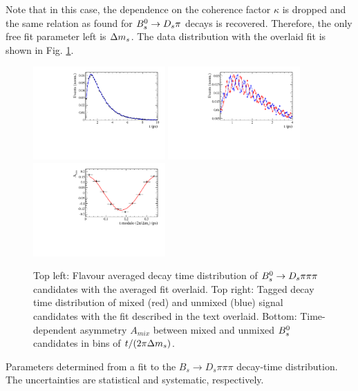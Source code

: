 Note that in this case, the dependence on the coherence factor $\kappa$ is dropped and the same relation as found for ${{B}^0_{s}}\rightarrow{\ensuremath{{D}_{s}}}{\ensuremath{\pi}}$ decays is recovered. 
Therefore, the only free fit parameter left is ${\Delta m_{{s}}}$. The data distribution with the overlaid fit is shown in Fig. \ref{fig:tFitNorm}.

\clearpage
\begin{figure}[h]
	\centering
		\includegraphics[width=0.45\textwidth, height = !]{figs/timeFit/norm_taggingCalib/h_t.pdf} 
		\includegraphics[width=0.45\textwidth, height = !]{figs/timeFit/norm_taggingCalib/h_t_mixed.pdf} 
		\includegraphics[width=0.45\textwidth, height = !]{figs/timeFit/norm_taggingCalib/h_asym.pdf} 		
		\caption{\small Top left: Flavour averaged decay time distribution of ${{B}^0_{s}}\rightarrow{\ensuremath{{D}_{s}}}{\ensuremath{\pi}}{\ensuremath{\pi}}{\ensuremath{\pi}}$ candidates with the averaged fit overlaid. 
Top right: Tagged decay time distribution of mixed (red) and unmixed (blue) signal candidates with the fit described in the text overlaid. 
Bottom: Time-dependent asymmetry $A_{mix}$ between mixed and unmixed ${{B}^0_{s}}$ candidates in bins of $t/(2\pi{\ensuremath{\Delta m_{{s}}}})$.} 		
		\label{fig:tFitNorm}
\end{figure}	

\begin{table}[h]
\centering
\caption{Parameters determined from a fit to the $B_s \to D_s \pi \pi\pi$ decay-time distribution. The uncertainties are statistical and systematic, respectively.}
	\renewcommand{\arraystretch}{1.25}
	
\end{table}

